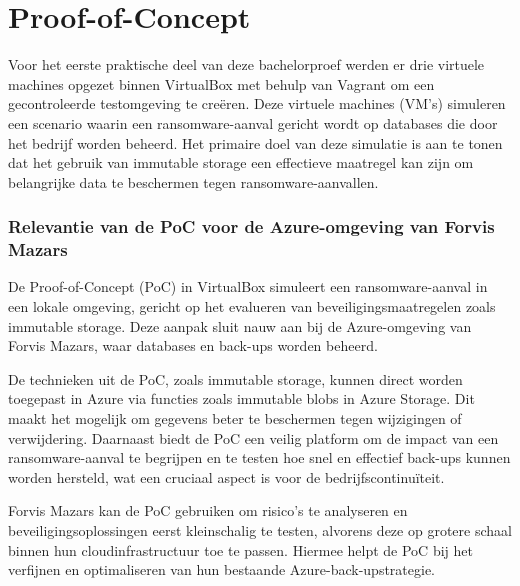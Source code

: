 \chapter{Proof-of-Concept}%
\label{ch:poc}
Voor het eerste praktische deel van deze bachelorproef werden er drie virtuele machines opgezet binnen VirtualBox met behulp van Vagrant om een gecontroleerde testomgeving te creëren. Deze virtuele machines (VM’s) simuleren een scenario waarin een ransomware-aanval gericht wordt op databases die door het bedrijf worden beheerd. Het primaire doel van deze simulatie is aan te tonen dat het gebruik van immutable storage een effectieve maatregel kan zijn om belangrijke data te beschermen tegen ransomware-aanvallen.
\subsection{Relevantie van de PoC voor de Azure-omgeving van Forvis Mazars}
De Proof-of-Concept (PoC) in VirtualBox simuleert een ransomware-aanval in een lokale omgeving, gericht op het evalueren van beveiligingsmaatregelen zoals immutable storage. Deze aanpak sluit nauw aan bij de Azure-omgeving van Forvis Mazars, waar databases en back-ups worden beheerd.

De technieken uit de PoC, zoals immutable storage, kunnen direct worden toegepast in Azure via functies zoals immutable blobs in Azure Storage. Dit maakt het mogelijk om gegevens beter te beschermen tegen wijzigingen of verwijdering. Daarnaast biedt de PoC een veilig platform om de impact van een ransomware-aanval te begrijpen en te testen hoe snel en effectief back-ups kunnen worden hersteld, wat een cruciaal aspect is voor de bedrijfscontinuïteit.

Forvis Mazars kan de PoC gebruiken om risico’s te analyseren en beveiligingsoplossingen eerst kleinschalig te testen, alvorens deze op grotere schaal binnen hun cloudinfrastructuur toe te passen. Hiermee helpt de PoC bij het verfijnen en optimaliseren van hun bestaande Azure-back-upstrategie.
